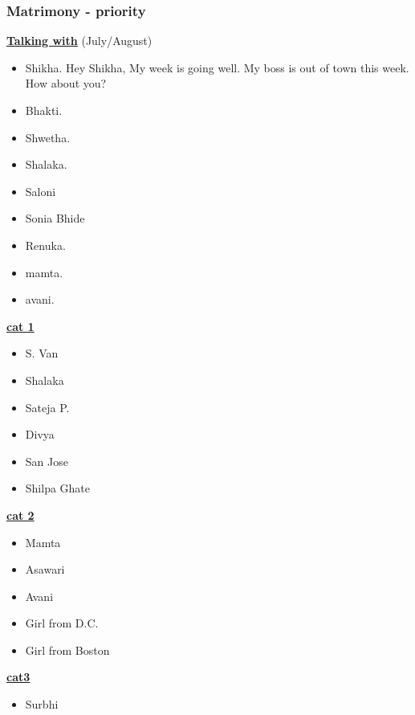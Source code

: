 \begin{frame}
\frametitle{Matrimony - priority}

{\small \underline{\bf Talking with} (July/August) } \\
\begin{itemize} 
\tiny \item \tiny Shikha. 
Hey Shikha, My week is going well. My boss is out of town this week. How
about you?

\item \tiny Bhakti.
\item \tiny Shwetha.
\item \tiny Shalaka.
\item \tiny Saloni 

\item \tiny Sonia Bhide 
\item \tiny Renuka. 

\item \tiny mamta. 

\item \tiny avani. 
\end{itemize}

{\small \underline{\bf cat 1} } \\
\begin{itemize} 
\tiny \item \tiny S. Van
\item \tiny Shalaka 
\item \tiny Sateja P. 
\item \tiny Divya 
\item \tiny San Jose 
\item \tiny Shilpa Ghate 
\end{itemize} 

{\small \underline{\bf cat 2}} \\
\begin{itemize} 
\tiny \item \tiny Mamta 
\item \tiny Asawari 
\item \tiny Avani
\item \tiny Girl from D.C.
\item \tiny Girl from Boston 
\end{itemize} 

{\small \underline{\bf cat3}} \\
\begin{itemize}
\tiny \item \tiny Surbhi 
\end{itemize}

\end{frame}



